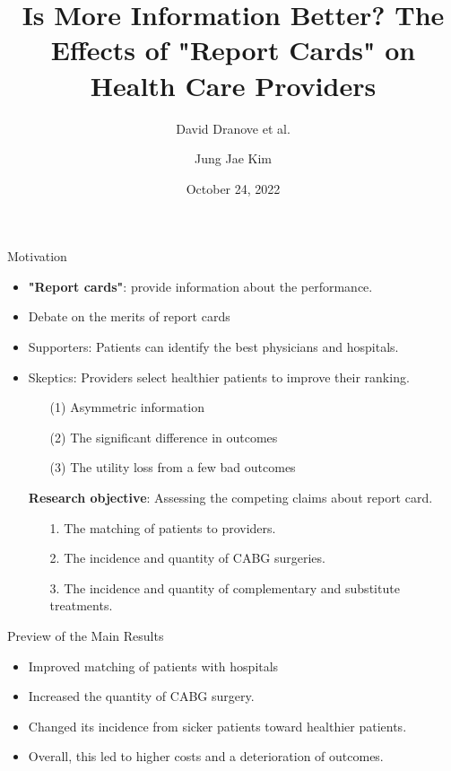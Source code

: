 \documentclass[10pt]{beamer}
\title{Is More Information Better? The Effects of "Report Cards" on Health Care Providers}
\subtitle{David Dranove et al.}
\date{October 24, 2022}
\author{Jung Jae Kim}
\begin{document}

\maketitle

\begin{frame}{Motivation}

\begin{itemize}
\item \textbf{"Report cards"}: provide information about the performance. 
\item Debate on the merits of report cards
\item Supporters: Patients can identify the best physicians and hospitals. 
\item Skeptics: Providers select healthier patients to improve their ranking.
    \begin{itemize}
        \item [(1)] Asymmetric information
        \item [(2)] The significant difference in outcomes
        \item [(3)] The utility loss from a few bad outcomes
    \end{itemize}
\end{itemize}

\begin{itemize}
    \item[] \textbf{Research objective}: Assessing the competing claims about report card.
    \begin{itemize}
        \item[1.] The matching of patients to providers.
        \item[2.] The incidence and quantity of CABG surgeries.
        \item[3.] The incidence and quantity of complementary and substitute treatments.
    \end{itemize}
\end{itemize}

\end{frame}

\begin{frame}{Preview of the Main Results}

\begin{itemize}
\item Improved matching of patients with hospitals
\item Increased the quantity of CABG surgery.
\item Changed its incidence from sicker patients toward healthier patients.
\item Overall, this led to higher costs and a deterioration of outcomes.
\end{itemize}

\end{frame}
\end{document}
